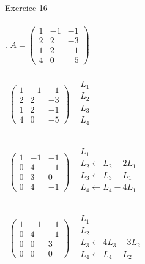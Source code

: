 \documentclass[11pt, fleqn]{report}
\begin{document}
\noindent Exercice 16
\\
\\
. $ A=\left(\begin{array}{ccc}1 & -1 & -1 \\2 & 2 & -3 \\1 & 2 & -1 \\4 & 0 & -5\end{array}\right) $
\\
\\

\noindent $ 
\begin{array}{cc}
	\left(\begin{array}{ccc}
		1 & -1 & -1 \\
		2 & 2 & -3 \\
		1 & 2 & -1 \\
		4 & 0 & -5
		\end{array}\right) 
	& \begin{array}{l}
		L_1 \\
		L_2 \\
		L_3 \\
		L_4 \\
	\end{array}
\end{array}
$
\\
\\

\noindent $ 
\begin{array}{cc}
	\left(\begin{array}{ccc}
		1 & -1 & -1 \\
		0 & 4 & -1 \\
		0 & 3 & 0 \\
		0 & 4 & -1
		\end{array}\right) 
	& \begin{array}{l}
		L_1 \\
		L_2 \leftarrow L_2-2L_1 \\
		L_3\leftarrow L_3-L_1 \\
		L_4\leftarrow L_4-4L_1 \\
	\end{array}
\end{array} $
\\
\\

\noindent $
\begin{array}{cc}
	\left(\begin{array}{ccc}
		1 & -1 & -1 \\
		0 & 4 & -1 \\
		0 & 0 & 3 \\
		0 & 0 & 0
		\end{array}\right) 
	& \begin{array}{l}
		L_1 \\
		L_2 \\
		L_3\leftarrow 4L_3-3L_2  \\
		L_4\leftarrow L_4-L_2 \\
	\end{array}
\end{array} $
\end{document}
